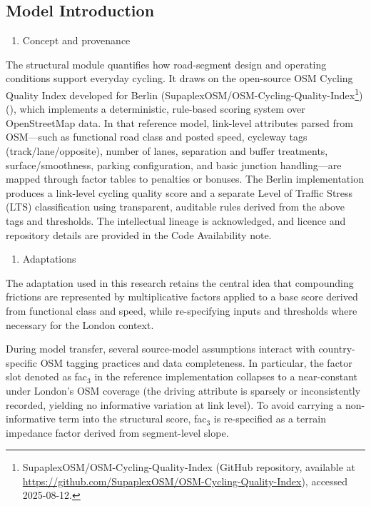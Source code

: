 \documentclass[
  12pt,
  oneside]{book}
\providecommand{\tightlist}{%
  \setlength{\itemsep}{0pt}\setlength{\parskip}{0pt}}
\begin{document}
\subsection{Model Introduction}\label{model-introduction}

\begin{enumerate}
\def\labelenumi{\arabic{enumi}.}
\tightlist
\item
  Concept and provenance
\end{enumerate}

The structural module quantifies how road-segment design and operating conditions support everyday cycling. It draws on the open-source OSM Cycling Quality Index developed for Berlin (SupaplexOSM/OSM-Cycling-Quality-Index\footnote{SupaplexOSM/OSM-Cycling-Quality-Index (GitHub repository, available at \url{https://github.com/SupaplexOSM/OSM-Cycling-Quality-Index}), accessed 2025-08-12.}) (\textcite{osm_cycling_quality_index}), which implements a deterministic, rule-based scoring system over OpenStreetMap data. In that reference model, link-level attributes parsed from OSM---such as functional road class and posted speed, cycleway tags (track/lane/opposite), number of lanes, separation and buffer treatments, surface/smoothness, parking configuration, and basic junction handling---are mapped through factor tables to penalties or bonuses. The Berlin implementation produces a link-level cycling quality score and a separate Level of Traffic Stress (LTS) classification using transparent, auditable rules derived from the above tags and thresholds. The intellectual lineage is acknowledged, and licence and repository details are provided in the Code Availability note.

\begin{enumerate}
\def\labelenumi{\arabic{enumi}.}
\setcounter{enumi}{1}
\tightlist
\item
  Adaptations
\end{enumerate}

The adaptation used in this research retains the central idea that compounding frictions are represented by multiplicative factors applied to a base score derived from functional class and speed, while re-specifying inputs and thresholds where necessary for the London context.

During model transfer, several source-model assumptions interact with country-specific OSM tagging practices and data completeness. In particular, the factor slot denoted as fac\(_3\) in the reference implementation collapses to a near-constant under London's OSM coverage (the driving attribute is sparsely or inconsistently recorded, yielding no informative variation at link level). To avoid carrying a non-informative term into the structural score, fac\(_3\) is re-specified as a terrain impedance factor derived from segment-level slope.
\end{document}
